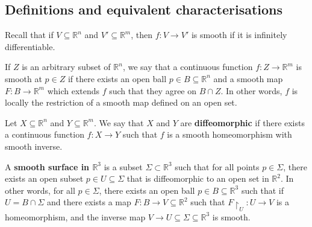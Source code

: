 \documentclass[a4paper]{article}
\begin{document}
\subsection{Definitions and equivalent characterisations}
Recall that if \( V \subseteq \mathbb R^n \) and \( V' \subseteq \mathbb R^m \), then \( f \colon V \to V' \) is smooth if it is infinitely differentiable.
\begin{definition}
	If \( Z \) is an arbitrary subset of \( \mathbb R^n \), we say that a continuous function \( f \colon Z \to \mathbb R^m \) is smooth at \( p \in Z \) if there exists an open ball \( p \in B \subseteq \mathbb R^n \) and a smooth map \( F \colon B \to \mathbb R^m \) which extends \( f \) such that they agree on \( B \cap Z \).
	In other words, \( f \) is locally the restriction of a smooth map defined on an open set.
\end{definition}
\begin{definition}
	Let \( X \subseteq \mathbb R^n \) and \( Y \subseteq \mathbb R^m \).
	We say that \( X \) and \( Y \) are \textbf{diffeomorphic} if there exists a continuous function \( f \colon X \to Y \) such that \( f \) is a smooth homeomorphism with smooth inverse.
\end{definition}

\begin{definition}
	A \textbf{smooth surface in \( \mathbb R^3 \)} is a subset \(\Sigma \subset \mathbb R^3 \) such that for all points \( p \in \Sigma \), there exists an open subset \( p \in U \subseteq \Sigma \) that is diffeomorphic to an open set in \( \mathbb R^2 \).
	In other words, for all \( p \in \Sigma \), there exists an open ball \( p \in B \subseteq \mathbb R^3 \) such that if \( U = B \cap \Sigma \) and there exists a map \( F \colon B \to V \subseteq \mathbb R^2 \) such that \( {F}\restriction_U \colon U \to V \) is a homeomorphism, and the inverse map \( V \to U \subseteq \Sigma \subseteq \mathbb R^3 \) is smooth.
\end{definition}
\end{document}
